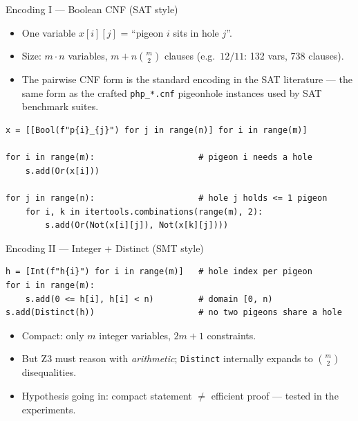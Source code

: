 \documentclass[10pt,aspectratio=169,xcolor={table}]{beamer}
\begin{document}
\begin{frame}[fragile]{Encoding I --- Boolean CNF (SAT style)}
  \begin{itemize}\itemsep1pt
    \item One variable $x[i][j]$ = ``pigeon $i$ sits in hole $j$''.
    \item Size: $m\cdot n$ variables, $m + n\binom{m}{2}$ clauses
          (e.g.\ $12/11$: 132 vars, 738 clauses).
    \item The pairwise CNF form is the standard encoding in the
          SAT literature --- the same form as the crafted
          \texttt{php\_*.cnf} pigeonhole instances used by SAT
          benchmark suites.
  \end{itemize}
\begin{lstlisting}[style=py]
x = [[Bool(f"p{i}_{j}") for j in range(n)] for i in range(m)]

for i in range(m):                     # pigeon i needs a hole
    s.add(Or(x[i]))

for j in range(n):                     # hole j holds <= 1 pigeon
    for i, k in itertools.combinations(range(m), 2):
        s.add(Or(Not(x[i][j]), Not(x[k][j])))
\end{lstlisting}
\end{frame}

\begin{frame}[fragile]{Encoding II --- Integer + Distinct (SMT style)}
\begin{lstlisting}[style=py]
h = [Int(f"h{i}") for i in range(m)]   # hole index per pigeon
for i in range(m):
    s.add(0 <= h[i], h[i] < n)         # domain [0, n)
s.add(Distinct(h))                     # no two pigeons share a hole
\end{lstlisting}
  \begin{itemize}\itemsep2pt
    \item Compact: only $m$ integer variables, $2m+1$ constraints.
    \item But Z3 must reason with \emph{arithmetic};
          \texttt{Distinct} internally expands to $\binom{m}{2}$
          disequalities.
    \item Hypothesis going in: compact \alert{statement} $\ne$
          efficient \alert{proof} --- tested in the experiments.
  \end{itemize}
\end{frame}
\end{document}
